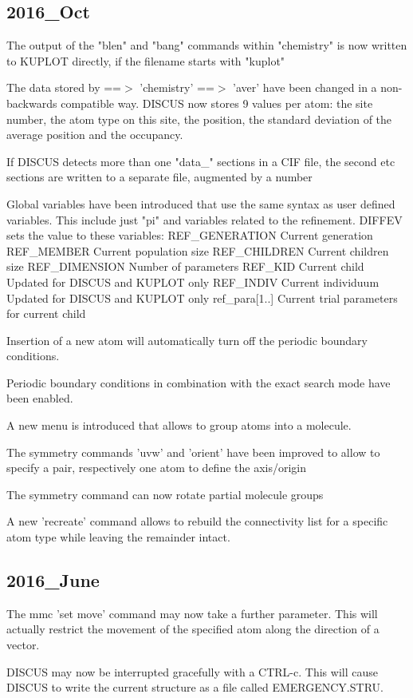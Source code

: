 \subsection*{2016\_Oct}
\par
The output of the "blen" and "bang" commands within "chemistry" 
is now written to KUPLOT directly, if the filename starts with 
"kuplot" 
\par
The data stored by ==$> $ 'chemistry' ==$> $ 'aver' have been changed in 
a non-backwards compatible way. DISCUS now stores 9 values per 
atom: 
the site number, the atom type on this site, the position, 
the standard deviation of the average position and the occupancy. 
\par
If DISCUS detects more than one "data\_" sections in a CIF file, 
the second etc sections are written to a separate file, augmented by 
a number 
\par
Global variables have been introduced that use the same syntax as 
user defined variables. This include just "pi" and variables related 
to the refinement. 
DIFFEV sets the value to these variables: 
REF\_GENERATION  Current generation 
REF\_MEMBER      Current population size 
REF\_CHILDREN    Current children size 
REF\_DIMENSION   Number of parameters 
REF\_KID         Current child Updated for DISCUS and KUPLOT only 
REF\_INDIV       Current individuum Updated for DISCUS and KUPLOT only 
ref\_para[1..]   Current trial parameters for current child 
\par
Insertion of a new atom will automatically turn off the periodic 
boundary conditions. 
\par
Periodic boundary conditions in combination with the exact search mode 
have been enabled. 
\par
A new menu is introduced that allows to group atoms into a molecule. 
\par
The symmetry commands 'uvw' and 'orient' have been improved to allow 
to specify a pair, respectively one atom to define the axis/origin 
\par
The symmetry command can now rotate partial molecule groups 
\par
A new 'recreate' command allows to rebuild the connectivity list 
for a specific atom type while leaving the remainder intact. 
\subsection*{2016\_June}
\par
The mmc 'set move' command may now take a further parameter. This 
will actually restrict the movement of the specified atom along 
the direction of a vector. 
\par
DISCUS may now be interrupted gracefully with a CTRL-c. 
This will cause DISCUS to write the current structure 
as a file called EMERGENCY.STRU. 
